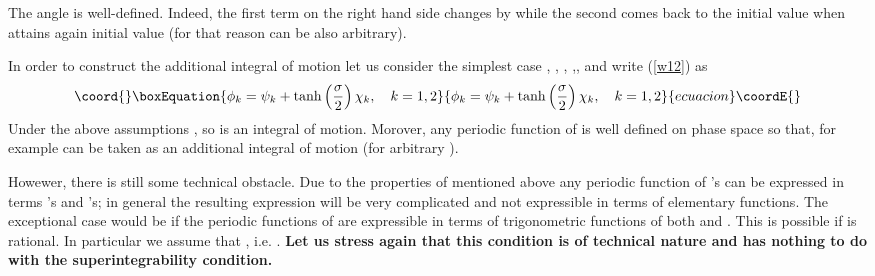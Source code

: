 \documentclass[a4paper,12pt]{article}
\begin{document}
The angle \coordHE{} is well-defined. Indeed, the first term on the right hand side changes by \myHighlight{$2\pi$}\coordHE{} 
while the second comes  back to the initial value when \coordHE{} attains again initial value
(for that reason \coordHE{} can be also arbitrary).

In order to construct the additional integral of motion let us consider the simplest case 
\coordHE{}, \coordHE{},  \coordHE{}, ,\coordHE{}, \coordHE{} and write (\ref{w12})
as
\begin{equation}\coord{}\boxEquation{
\phi_k = \psi_k+\tanh\left(\frac{\sigma}{2}\right)\chi_k, \ \ \ k=1,2
\label{w13}
}{
\phi_k = \psi_k+\tanh\left(\frac{\sigma}{2}\right)\chi_k, \ \ \ k=1,2
}{ecuacion}\coordE{}\end{equation}
Under the above assumptions \coordHE{}, so \coordHE{} is an integral of motion.
Morover, any periodic function of \coordHE{} is well defined on phase space so that,
for example \coordHE{} can be taken as an additional integral of motion
(for arbitrary \coordHE{}).

Howewer, there is still some technical obstacle. Due to the properties of \coordHE{} mentioned above
any periodic function of \coordHE{}'s can be expressed in terms \coordHE{}'s and \coordHE{}'s;
in general the resulting expression will be very complicated and not expressible in terms
of elementary functions. The exceptional case would be if the periodic functions
 of \coordHE{} are expressible in terms of trigonometric functions of both \coordHE{} and \coordHE{}.
This is possible if \coordHE{} is rational.
In particular we assume that \coordHE{}, i.e. 
\coordHE{}.
{\bf Let us stress again that this condition is of technical nature and has nothing to do with
the superintegrability condition.}
\end{document}
